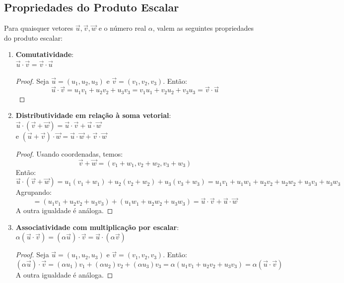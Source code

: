 \subsection{Propriedades do Produto Escalar}

Para quaisquer vetores $\vec{u}, \vec{v}, \vec{w}$ e o número real $\alpha$,
valem as seguintes propriedades do produto escalar:

\begin{enumerate}[label=\Roman*)]
  \item \textbf{Comutatividade}: \\
  $\vec{u} \cdot \vec{v} = \vec{v} \cdot \vec{u}$

  \begin{proof}
    Seja $\vec{u} = (u_1, u_2, u_3)$ e $\vec{v} = (v_1, v_2, v_3)$. Então:
    \[
      \vec{u} \cdot \vec{v} = u_1v_1 + u_2v_2 + u_3v_3 = v_1u_1 + v_2u_2 + v_3u_3 = \vec{v} \cdot \vec{u}
    \]
  \end{proof}
    
  \item \textbf{Distributividade em relação à soma vetorial}: \\
  $\vec{u} \cdot (\vec{v} + \vec{w}) = \vec{u} \cdot \vec{v} + \vec{u} \cdot \vec{w}$ \\
  e $(\vec{u} + \vec{v}) \cdot \vec{w} = \vec{u} \cdot \vec{w} + \vec{v} \cdot \vec{w}$

  \begin{proof}
    Usando coordenadas, temos:
    \[
      \vec{v} + \vec{w} = (v_1 + w_1, v_2 + w_2, v_3 + w_3)
    \]
    Então:
    \[
      \vec{u} \cdot (\vec{v} + \vec{w}) = u_1(v_1 + w_1) + u_2(v_2 + w_2) + u_3(v_3 + w_3)
      = u_1v_1 + u_1w_1 + u_2v_2 + u_2w_2 + u_3v_3 + u_3w_3
    \]
    Agrupando:
    \[
      = (u_1v_1 + u_2v_2 + u_3v_3) + (u_1w_1 + u_2w_2 + u_3w_3)
      = \vec{u} \cdot \vec{v} + \vec{u} \cdot \vec{w}
    \]
    A outra igualdade é análoga.
  \end{proof}
 
  \newpage
  \item \textbf{Associatividade com multiplicação por escalar}: \\
  $\alpha(\vec{u} \cdot \vec{v}) = (\alpha\vec{u}) \cdot \vec{v} = \vec{u} \cdot (\alpha\vec{v})$

  \begin{proof}
    Seja $\vec{u} = (u_1, u_2, u_3)$ e $\vec{v} = (v_1, v_2, v_3)$. Então:
    \[
      (\alpha \vec{u}) \cdot \vec{v} = (\alpha u_1)v_1 + (\alpha u_2)v_2 + (\alpha u_3)v_3 = \alpha(u_1v_1 + u_2v_2 + u_3v_3) = \alpha(\vec{u} \cdot \vec{v})
    \]
    A outra igualdade é análoga.
  \end{proof}
  

\end{enumerate}
